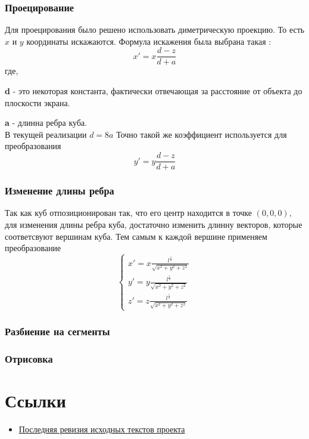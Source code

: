 \documentclass[a4paper,11pt]{article}
\begin{document}
  \section{Проецирование}
 Для проецирования было решено использовать диметрическую проекцию. То есть $x$ и $y$ координаты искажаются. Формула искажения была выбрана такая : 
\[  x' = x\frac{d-z}{d+a} \]
где, 


 
\textbf{d} - это некоторая константа, фактически отвечающая за расстояние от объекта до плоскости экрана. 



\textbf{a} - длинна ребра куба. 
\\
В текущей реализации $d = 8a$
Точно такой же коэффициент используется для преобразования 
\[  y' = y\frac{d-z}{d+a} \]
  
  \section{Изменение длины ребра}
  Так как куб отпозиционирован так, что его центр находится в точке $(0,0,0)$, 
  для изменения длины ребра куба, достаточно изменить длинну векторов, которые соответсвуют вершинам куба. Тем самым к каждой вершине применяем преобразование
  \linebreak
\[ 
\begin{cases}
   x' = x\frac{l^{\frac{1}{3}}}{\sqrt{x^2+y^2+z^2}} \\
   y' = y\frac{l^{\frac{1}{3}}}{\sqrt{x^2+y^2+z^2}} \\
   z' = z\frac{l^{\frac{1}{3}}}{\sqrt{x^2+y^2+z^2}}
\end{cases}
 \] 
  \section{Разбиение на сегменты}
  \section{Отрисовка}
\part{Ссылки}
  \begin{itemize}
    \item \href{https://github.com/DziedMaroz/Cube/tree/ColorCube/src/Cube}{Последняя ревизия исходных текстов проекта}
     
  \end{itemize}
\end{document}
